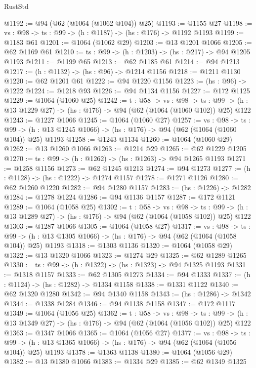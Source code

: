 \begin{lexlean}{RustStd}
\begin{coremodule}
@1192 := @94 (@62 (@1064 (@1062 @104)) @25)
@1193 := @1155 @27
@1198 := {vs : @98} -> {ts : @99} -> (h : @1187) -> (hs : @176) -> @1192 @1193
@1199 := @1183 @61
@1201 := @1064 (@1062 @29)
@1203 := @13 @1201 @1066
@1205 := @62 @1169 @61
@1210 := {ts : @99} -> (h : @1203) -> (hs : @217) -> @94 @1205 @1193
@1211 := @1199 @65
@1213 := @62 @1185 @61
@1214 := @94 @1213
@1217 := (h : @1132) -> (hs : @96) -> @1214 @1156
@1218 := @1211 @1130
@1220 := @62 @1201 @61
@1222 := @94 @1220 @1156
@1223 := (hs : @96) -> @1222
@1224 := @1218 @93
@1226 := @94 @1134 @1156
@1227 := @172 @1125
@1229 := @1064 (@1060 @25)
@1242 := {t : @58} ->
  {vs : @98} ->
  {ts : @99} -> (h : @13 @1229 @27) -> (hs : @176) -> @94 (@62 (@1064 (@1060 @102)) @25) @122
@1243 := @1227 @1066
@1245 := @1064 (@1060 @27)
@1257 := {vs : @98} ->
  {ts : @99} -> (h : @13 @1245 @1066) -> (hs : @176) -> @94 (@62 (@1064 (@1060 @104)) @25) @1193
@1258 := @1243 @1134
@1260 := @1064 (@1060 @29)
@1262 := @13 @1260 @1066
@1263 := @1214 @29
@1265 := @62 @1229 @1205
@1270 := {ts : @99} -> (h : @1262) -> (hs : @1263) -> @94 @1265 @1193
@1271 := @1258 @1156
@1273 := @62 @1245 @1213
@1274 := @94 @1273
@1277 := (h : @1128) -> (hs : @1222) -> @1274 @1157
@1278 := @1271 @1126
@1280 := @62 @1260 @1220
@1282 := @94 @1280 @1157
@1283 := (hs : @1226) -> @1282
@1284 := @1278 @1224
@1286 := @94 @1136 @1157
@1287 := @172 @1121
@1289 := @1064 (@1058 @25)
@1302 := {t : @58} ->
  {vs : @98} ->
  {ts : @99} -> (h : @13 @1289 @27) -> (hs : @176) -> @94 (@62 (@1064 (@1058 @102)) @25) @122
@1303 := @1287 @1066
@1305 := @1064 (@1058 @27)
@1317 := {vs : @98} ->
  {ts : @99} -> (h : @13 @1305 @1066) -> (hs : @176) -> @94 (@62 (@1064 (@1058 @104)) @25) @1193
@1318 := @1303 @1136
@1320 := @1064 (@1058 @29)
@1322 := @13 @1320 @1066
@1323 := @1274 @29
@1325 := @62 @1289 @1265
@1330 := {ts : @99} -> (h : @1322) -> (hs : @1323) -> @94 @1325 @1193
@1331 := @1318 @1157
@1333 := @62 @1305 @1273
@1334 := @94 @1333
@1337 := (h : @1124) -> (hs : @1282) -> @1334 @1158
@1338 := @1331 @1122
@1340 := @62 @1320 @1280
@1342 := @94 @1340 @1158
@1343 := (hs : @1286) -> @1342
@1344 := @1338 @1284
@1346 := @94 @1138 @1158
@1347 := @172 @1117
@1349 := @1064 (@1056 @25)
@1362 := {t : @58} ->
  {vs : @98} ->
  {ts : @99} -> (h : @13 @1349 @27) -> (hs : @176) -> @94 (@62 (@1064 (@1056 @102)) @25) @122
@1363 := @1347 @1066
@1365 := @1064 (@1056 @27)
@1377 := {vs : @98} ->
  {ts : @99} -> (h : @13 @1365 @1066) -> (hs : @176) -> @94 (@62 (@1064 (@1056 @104)) @25) @1193
@1378 := @1363 @1138
@1380 := @1064 (@1056 @29)
@1382 := @13 @1380 @1066
@1383 := @1334 @29
@1385 := @62 @1349 @1325

\end{coremodule}
\end{lexlean}
